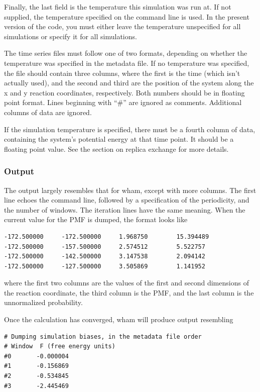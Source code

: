 \documentclass[12pt]{article}
\begin{document}
Finally, the last field is the temperature this simulation was run at.  If
not supplied, the temperature specified on the command line is used.  In
the present version of the code, you must either leave the temperature
unspecified for all simulations or specify it for all simulations.  

The time series files must follow one of two formats, depending on whether
the temperature was specified in the metadata file.  If no temperature was
specified, the file should contain three columns, where the first is the
time (which isn't actually used), and the second and third are the position
of the system along the x and y reaction coordinates, respectively.  Both
numbers should be in floating point format.  Lines beginning with ``\#'' are
ignored as comments.  Additional columns of data are ignored.

If the simulation temperature is specified, there must be a fourth column of
data, containing the system's potential energy at that time point.  It
should be a floating point value.  See the section on replica exchange for
more details.

\subsubsection{Output}

The output largely resembles that for wham, except with more columns.  The
first line echoes the command line, followed by a specification of the
periodicity, and the number of windows.  The iteration lines have the same
meaning.  When the current value for the PMF is dumped, the format looks
like 

\begin{verbatim}
-172.500000     -172.500000     1.968750        15.394489
-172.500000     -157.500000     2.574512        5.522757
-172.500000     -142.500000     3.147538        2.094142
-172.500000     -127.500000     3.505869        1.141952
\end{verbatim}
where the first two columns are the values of the first and second
dimensions of the reaction coordinate, the third column is the PMF, and the 
last column is the unnormalized probability.  

Once the calculation has converged, wham will produce output resembling

\begin{verbatim}
# Dumping simulation biases, in the metadata file order 
# Window  F (free energy units)
#0       -0.000004
#1       -0.156869
#2       -0.534845
#3       -2.445469
\end{verbatim}
\end{document}
